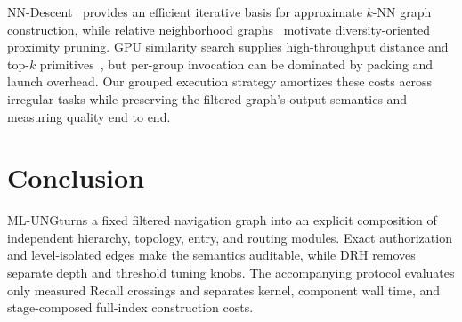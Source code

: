 \documentclass[sigconf,review,anonymous]{acmart}
\newcommand{\system}{\textsc{ML-UNG}}
\begin{document}
NN-Descent~\cite{dong2011nndescent} provides an efficient iterative basis for
approximate $k$-NN graph construction, while relative neighborhood
graphs~\cite{toussaint1980rng} motivate diversity-oriented proximity pruning.
GPU similarity search supplies high-throughput distance and top-$k$
primitives~\cite{johnson2021gpu}, but per-group invocation can be dominated by
packing and launch overhead.  Our grouped execution strategy amortizes these
costs across irregular tasks while preserving the filtered graph's output
semantics and measuring quality end to end.

\section{Conclusion}
\system turns a fixed filtered navigation graph into an explicit composition
of independent hierarchy, topology, entry, and routing modules.  Exact
authorization and level-isolated edges make the semantics auditable, while DRH
removes separate depth and threshold tuning knobs.  The accompanying protocol
evaluates only measured Recall crossings and separates kernel, component wall
time, and stage-composed full-index construction costs.
\authoritativeConclusionResult

\authoritativeScreenAppendix



\end{document}
